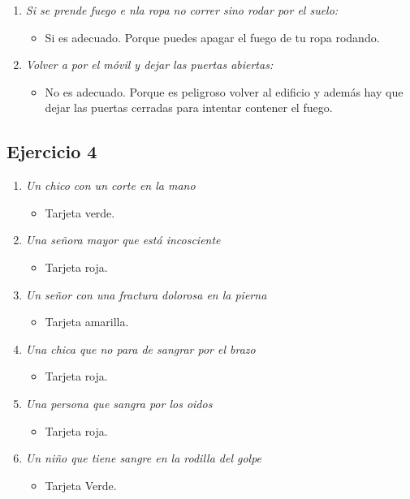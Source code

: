 \documentclass{article}
\begin{document}
\begin{enumerate}[label=(\alph*)]
\begin{itemize}
            \end{itemize}
          \item \textit{Si se prende fuego e nla ropa no correr sino rodar por el suelo:}
            \begin{itemize}
              \item Si es adecuado. Porque puedes apagar el fuego de tu ropa rodando.
            \end{itemize}
          \item \textit{Volver a por el móvil y dejar las puertas abiertas:}
            \begin{itemize}
              \item No es adecuado. Porque es peligroso volver al edificio y además hay que dejar las puertas cerradas para intentar contener el fuego.
            \end{itemize}
        \end{enumerate}

      \subsection{Ejercicio 4}
        \begin{enumerate}[label=(\alph*)]
          \item \textit{Un chico con un corte en la mano}
            \begin{itemize}
              \item Tarjeta verde.
            \end{itemize}
          \item \textit{Una señora mayor que está incosciente}
            \begin{itemize}
              \item Tarjeta roja.
            \end{itemize}
          \item \textit{Un señor con una fractura dolorosa en la pierna}
            \begin{itemize}
              \item Tarjeta amarilla.
            \end{itemize}
          \item \textit{Una chica que no para de sangrar por el brazo}
            \begin{itemize}
              \item Tarjeta roja.
            \end{itemize}
          \item \textit{Una persona que sangra por los oidos}
            \begin{itemize}
              \item Tarjeta roja.
            \end{itemize}
          \item \textit{Un niño que tiene sangre en la rodilla del golpe}
            \begin{itemize}
              \item Tarjeta Verde.
            \end{itemize}
        \end{enumerate}
\end{document}
